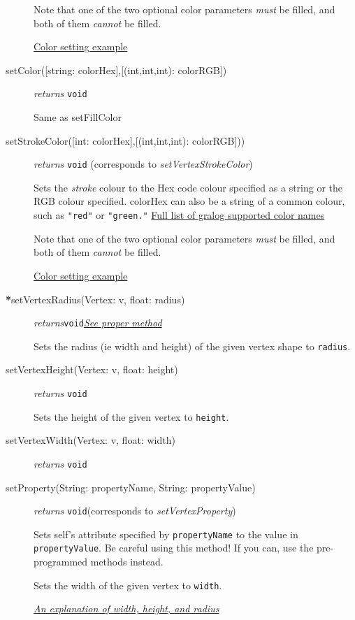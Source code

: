 \begin{description}
Note that one of the two optional color parameters \textit{must} be filled, and both of them \textit{cannot} be filled.

\hyperref[colorNamesSupportedByGralog]{Color setting example}

\item[setColor({[string: colorHex]},{[(int,int,int): colorRGB]})]\emph{returns}
  \texttt{void}
  
Same as setFillColor

\label{setVertexStrokeColorClass}\item[setStrokeColor({[int: colorHex]},{[(int,int,int): colorRGB]}))] \emph{returns} \texttt{void} (corresponds to \textit{setVertexStrokeColor})

Sets the \textit{stroke} colour to the Hex code colour
specified as a string or the RGB colour specified. colorHex can also be
a string of a common colour, such as \texttt{"red"} or
\texttt{"green."} \hyperref[colorNamesSupportedByGralog]{Full list of gralog supported color names}

Note that one of the two optional color parameters \textit{must} be filled, and both of them \textit{cannot} be filled.

\hyperref[colorNamesSupportedByGralog]{Color setting example}

\item[\textbf{*}setVertexRadius(Vertex: v, float: radius)] \emph{returns}\texttt{void}\quad \hyperref[setVertexRadiusClass]{\textit{See proper method}}


Sets the radius (ie width and height) of the given vertex shape to \texttt{radius}.

\item[setVertexHeight(Vertex: v, float: height)] \emph{returns}
  \texttt{void}

Sets the height of the given vertex to \texttt{height}.

\item[setVertexWidth(Vertex: v, float: width)] \emph{returns}
  \texttt{void}
  
\label{setVertexPropertyClass}\item[setProperty(String: propertyName, String: propertyValue)] \emph{returns} \texttt{void}\quad(corresponds to \textit{setVertexProperty})

Sets self's attribute specified by \texttt{propertyName} to the value in \texttt{propertyValue}. Be careful using this method! If you can, use the pre-programmed methods instead.

Sets the width of the given vertex to \texttt{width}. 

\hyperref[radiusWidthHeightDiagram]{\textit{An explanation of width, height, and radius}}

\end{description}

